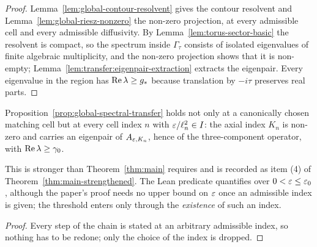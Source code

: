 \begin{proof}
  \leanok
  Lemma~\ref{lem:global-contour-resolvent} gives the contour resolvent and
  Lemma~\ref{lem:global-riesz-nonzero} the non-zero projection, at every admissible cell
  and every admissible diffusivity.  By Lemma~\ref{lem:torus-sector-basic} the resolvent is
  compact, so the spectrum inside $\Gamma_\tau$ consists of isolated eigenvalues of finite
  algebraic multiplicity, and the non-zero projection shows that it is non-empty;
  Lemma~\ref{lem:transfer:eigenpair-extraction} extracts the eigenpair.  Every eigenvalue in
  the region has $\operatorname{Re}\lambda\geq g_*$ because translation by $-i\tau$ preserves real
  parts.
\end{proof}

\begin{lemma}
  \label{lem:transfer:all-cells}
  \leanok
  Proposition~\ref{prop:global-spectral-transfer} holds not only at a canonically chosen
  matching cell but at every cell index $n$ with $\varepsilon/\ell_n^2\in I$: the axial index
  $K_n$ is non-zero and carries an eigenpair of $A_{\varepsilon,K_n}$, hence of the
  three-component operator, with $\operatorname{Re}\lambda\geq\gamma_0$.
\end{lemma}

This is stronger than Theorem~\ref{thm:main} requires and is recorded as item (4) of
Theorem~\ref{thm:main-strengthened}.  The Lean predicate quantifies over
$0<\varepsilon\leq\varepsilon_0$, although the paper's proof needs no upper bound on $\varepsilon$ once an
admissible index is given; the threshold enters only through the \emph{existence} of such
an index.

\begin{proof}
  \leanok
  Every step of the chain is stated at an arbitrary admissible index, so nothing has to be
  redone; only the choice of the index is dropped.
\end{proof}
